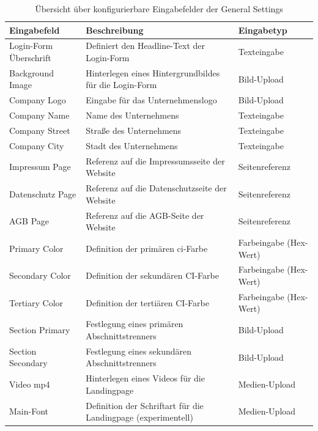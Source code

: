 \documentclass[
	ngerman,
	BCOR=8mm,
	headings=normal,
	parskip=half,
	headsepline,
	automark,
	listof=totoc,
	bibliography=totoc,
]{scrreprt}
\begin{document}
\begin{table}[h]
    \centering
    \renewcommand{\arraystretch}{1.3}
    \begin{tabular}{|p{3cm}|p{6cm}|p{5cm}|}
        \hline
        \textbf{Eingabefeld} & \textbf{Beschreibung} & \textbf{Eingabetyp} \\
        \hline
        Login-Form Überschrift & Definiert den Headline-Text der Login-Form & Texteingabe \\
        \hline
        Background Image & Hinterlegen eines Hintergrundbildes für die Login-Form & Bild-Upload \\
        \hline
        Company Logo & Eingabe für das Unternehmenslogo & Bild-Upload \\
        \hline
        Company Name & Name des Unternehmens & Texteingabe \\
        \hline
        Company Street & Straße des Unternehmens & Texteingabe \\
        \hline
        Company City & Stadt des Unternehmens & Texteingabe \\
        \hline
        Impressum Page & Referenz auf die Impressumsseite der Website & Seitenreferenz \\
        \hline
        Datenschutz Page & Referenz auf die Datenschutzseite der Website & Seitenreferenz \\
        \hline
        AGB Page & Referenz auf die AGB-Seite der Website & Seitenreferenz \\
        \hline
        Primary Color & Definition der primären \gls{ci}-Farbe & Farbeingabe (Hex-Wert) \\
        \hline
        Secondary Color & Definition der sekundären CI-Farbe & Farbeingabe (Hex-Wert) \\
        \hline
        Tertiary Color & Definition der tertiären CI-Farbe & Farbeingabe (Hex-Wert) \\
        \hline
        Section Primary & Festlegung eines primären Abschnittstrenners & Bild-Upload \\
        \hline
        Section Secondary & Festlegung eines sekundären Abschnittstrenners & Bild-Upload \\
        \hline
        Video \gls{mp4} & Hinterlegen eines Videos für die Landingpage & Medien-Upload          \\
        \hline
        Main-Font & Definition der Schriftart für die Landingpage (experimentell) & Medien-Upload \\
        \hline
    \end{tabular}
    \caption{Übersicht über konfigurierbare Eingabefelder der General Settings}
    \label{tab:eingabefelder_general_settings}
\end{table}
\end{document}
